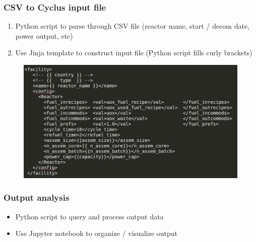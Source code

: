 \begin{frame}
    \frametitle{CSV to Cyclus input file}
    \begin{enumerate}
        \item Python script to parse through CSV file (reactor name, start / decom date, power output, etc)
        \item Use Jinja template to construct input file (Python script fills curly brackets)
    \end{enumerate}
    \begin{figure}[htbp!]
        \begin{center}
                \includegraphics[width=.8\textwidth]{./images/reactor_template.png}
        \end{center}
    \end{figure}
\end{frame}

\begin{frame}
    \frametitle{Output analysis}
    \begin{itemize}
        \item Python script to query and process output data
        \item Use Jupyter notebook to organize / visualize output
    \end{itemize}

\end{frame}

